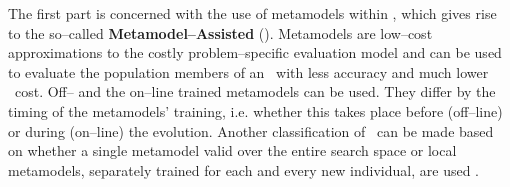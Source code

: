 \documentclass{vki_ls}
\newcommand{\attn}{\hspace{0cm}\color{red}}
\begin{document}
The first part is concerned with the use of metamodels within \EAs, which gives rise to the so--called \textbf{Metamodel--Assisted \EAs} (\MAEAs). Metamodels are low--cost approximations to the costly problem--specific evaluation model and can be used to evaluate the population members of an \EA\ with less accuracy and much lower \CPU\ cost.
Off-- and the on--line trained metamodels can be used. 
They differ by the timing of the metamodels' training, i.e. whether this takes place before (off--line) or during (on--line) the evolution. 
Another classification of \MAEAs\ can be made based on whether a single metamodel valid over the entire search space or local metamodels, separately trained for each and every new individual, are used 
\cite{Nak2004, Buch2005, LTT_3_054, LTT_2_029, LTT_3_064, Ong2003a}.
\end{document}
